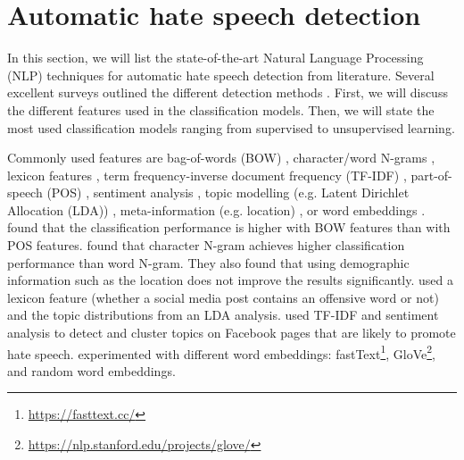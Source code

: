 \section{Automatic hate speech detection}
\label{sec:related-work-detection-algorithms}
%
In this section, we will list the state-of-the-art Natural Language Processing (NLP) techniques for automatic hate speech detection from literature.
%
Several excellent surveys outlined the different detection methods \citep{fortuna2018survey, schmidt2019survey}.
%
First, we will discuss the different features used in the classification models.
%
Then, we will state the most used classification models ranging from supervised to unsupervised learning.
%

%
Commonly used features are bag-of-words (BOW) \citep{greevy2004classifying}, character/word N-grams \citep{waseem2016hateful}, lexicon features \citep{xiang2012detecting},  term frequency-inverse document frequency (TF-IDF) \citep{badjatiya2017deep, davidson2017automated, rodriguez2019automatic}, part-of-speech (POS) \citep{greevy2004classifying}, sentiment analysis \citep{rodriguez2019automatic}, topic modelling (e.g. Latent Dirichlet Allocation (LDA)) \citep{xiang2012detecting}, meta-information (e.g. location) \citep{waseem2016hateful}, or word embeddings \citep{badjatiya2017deep, agrawal2018deep}.
%
\citet{greevy2004classifying} found that the classification performance is higher with BOW features than with POS features.
%
\citet{waseem2016hateful} found that character N-gram achieves higher classification performance than word N-gram.
%
They also found that using demographic information such as the location does not improve the results significantly.
%
\citet{xiang2012detecting} used a lexicon feature (whether a social media post contains an offensive word or not) and the topic distributions from an LDA analysis.
%
\citet{rodriguez2019automatic} used TF-IDF and sentiment analysis to detect and cluster topics on Facebook pages that are likely to promote hate speech.
%
\citet{badjatiya2017deep} experimented with different word embeddings: fastText\footnote{\url{https://fasttext.cc/}}, GloVe\footnote{\url{https://nlp.stanford.edu/projects/glove/}}, and random word embeddings.
%

